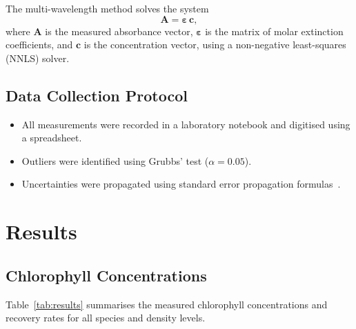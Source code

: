 \documentclass[
    language=english,
    doctype=article,
    institution=none,
    titlestyle=book,
]{../../omnilatex}
\begin{document}
The multi-wavelength method solves the system
\begin{equation}
    \mathbf{A} = \boldsymbol{\varepsilon}\,\mathbf{c},
    \label{eq:multiwavelength}
\end{equation}
where $\mathbf{A}$ is the measured absorbance vector,
$\boldsymbol{\varepsilon}$ is the matrix of molar extinction coefficients, and
$\mathbf{c}$ is the concentration vector, using a non-negative least-squares
(NNLS) solver.

\subsection{Data Collection Protocol}
\begin{itemize}
    \item All measurements were recorded in a laboratory notebook and
          digitised using a spreadsheet.
    \item Outliers were identified using Grubbs' test ($\alpha = 0.05$).
    \item Uncertainties were propagated using standard error propagation
          formulas~\cite{baehrThermodynamikGrundlagenUnd2016}.
\end{itemize}

\section{Results}

\subsection{Chlorophyll Concentrations}
Table~\ref{tab:results} summarises the measured chlorophyll concentrations and
recovery rates for all species and density levels.
\end{document}
